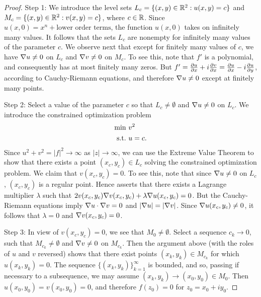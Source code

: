 \begin{proof}
Step 1: 
We introduce the level sets $L_c = \{ (x,y) \in \mathbb{R}^2 : u(x,y)=c \}$ and $M_c = \{ (x,y) \in \mathbb{R}^2 : v(x,y)=c \}$, where $c \in \mathbb{R}$.
Since $u(x, 0) = x^n+ \text{lower order terms}$, the function $u(x, 0)$ takes on infinitely many values.
It follows that the sets $L_c$ are nonempty for infinitely many values of the parameter $c$.
We observe next that except for finitely many values of $c$, we have $\nabla u \neq 0$ on $L_c$ and $\nabla v \neq 0$ on $M_c$.
To see this, note that $f'$ is a polynomial, and consequently has at most finitely many zeros.
But $f' = \frac{\partial u}{\partial x} + i\frac{\partial v}{\partial x} = \frac{\partial u}{\partial x} - i\frac{\partial u}{\partial y}$, according to Cauchy-Riemann equations, and therefore $\nabla u \neq 0$ except at finitely many
points.

Step 2:
Select a value of the parameter $c$ so that $L_c \neq \emptyset$ and $\nabla u \neq 0$ on $L_c$.
We introduce the constrained optimization problem
\begin{align}
\min \ & v^2 \\
\mathrm{s.t. \ }  & u = c.
\end{align}
Since $u^2 + v^2 = |f|^2 \to \infty$ as $|z| \to \infty$, we can use the Extreme Value Theorem to show that there exists a point $(x_c, y_c) \in L_c$ solving the constrained optimization problem.
We claim that $v(x_c,y_c) = 0$.
To see this, note that since $\nabla u \neq 0$ on $L_c$, $(x_c, y_c)$ is a regular point. 
Hence  asserts that there exists a Lagrange multiplier $\lambda$ such that $2v(x_c,y_c) \nabla v(x_c,y_c) + \lambda \nabla u(x_c,y_c) = 0$.
But the Cauchy-Riemann equations imply $\nabla u \cdot \nabla v = 0$ and $|\nabla u| = |\nabla v|$.
Since $\nabla u(x_c, y_c) \neq 0$, it follows that $\lambda = 0$ and $\nabla v(x_c, y_c) = 0$.

Step 3:
In view of $v(x_c,y_c)=0$, we see that $M_0 \neq \emptyset$.
Select a sequence $c_k \to 0$, such that $M_{c_k} \neq \emptyset$ and $\nabla v \neq 0$ on $M_{c_k}$.
Then the argument above (with the roles of $u$ and $v$ reversed) shows that
there exist points $(x_k, y_k) \in M_{c_k}$ for which $u(x_k, y_k) = 0$.
The sequence $\{ (x_k, y_k) \}_{k=1}^{\infty}$ is bounded, and so, passing if necessary to a subsequence, we may assume $(x_k, y_k) \to (x_0, y_0) \in M_0$.
Then $u(x_0, y_0) = v(x_0, y_0) = 0$, and therefore $f(z_0) = 0$ for $z_0 = x_0+iy_0$.
\end{proof}